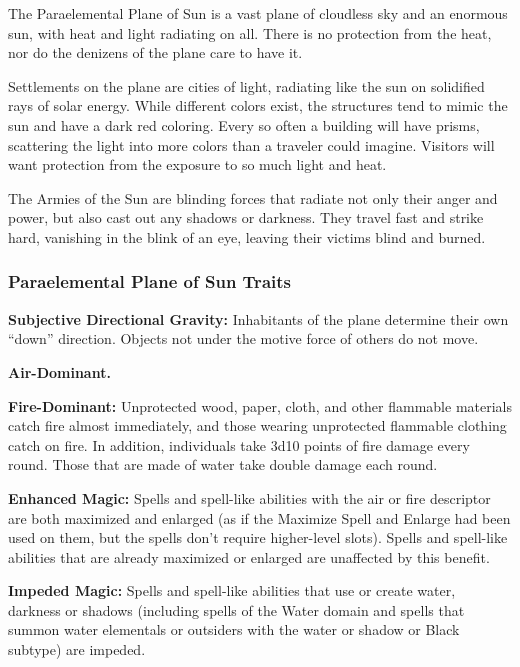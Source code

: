 The Paraelemental Plane of Sun is a vast plane of cloudless sky and an enormous sun, with heat and light radiating on all. There is no protection from the heat, nor do the denizens of the plane care to have it.

Settlements on the plane are cities of light, radiating like the sun on solidified rays of solar energy. While different colors exist, the structures tend to mimic the sun and have a dark red coloring. Every so often a building will have prisms, scattering the light into more colors than a traveler could imagine. Visitors will want protection from the exposure to so much light and heat.

The Armies of the Sun are blinding forces that radiate not only their anger and power, but also cast out any shadows or darkness. They travel fast and strike hard, vanishing in the blink of an eye, leaving their victims blind and burned.

\subsubsection{Paraelemental Plane of Sun Traits}
\begin{itemize*}
\item \textbf{Subjective Directional Gravity:} Inhabitants of the plane determine their own ``down'' direction. Objects not under the motive force of others do not move.
\item \textbf{Air-Dominant.}
\item \textbf{Fire-Dominant:} Unprotected wood, paper, cloth, and other flammable materials catch fire almost immediately, and those wearing unprotected flammable clothing catch on fire. In addition, individuals take 3d10 points of fire damage every round. Those that are made of water take double damage each round.
\item \textbf{Enhanced Magic:} Spells and spell-like abilities with the air or fire descriptor are both maximized and enlarged (as if the Maximize Spell and Enlarge had been used on them, but the spells don't require higher-level slots). Spells and spell-like abilities that are already maximized or enlarged are unaffected by this benefit.
\item \textbf{Impeded Magic:} Spells and spell-like abilities that use or create water, darkness or shadows (including spells of the Water domain and spells that summon water elementals or outsiders with the water or shadow or Black subtype) are impeded.
\end{itemize*}
